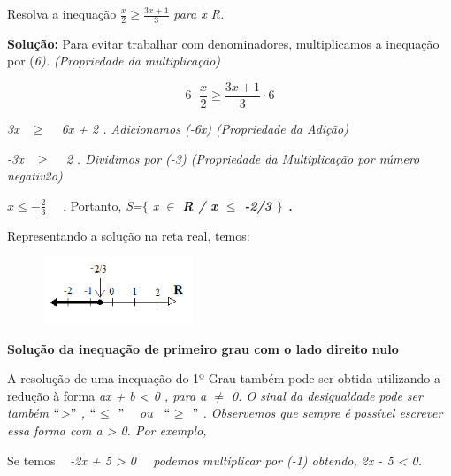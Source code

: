 \begin{texemplo}
Resolva a inequação   \( \frac{x}{2} \geq \frac{3x+1}{3} \) \textit{ para x  R.}

\textbf{Solução:} Para evitar trabalhar com denominadores, multiplicamos a inequação por (\textit{6). (Propriedade da multiplicação)}

 \[  \]  \[ 6 \cdot \frac{x}{2} \geq \frac{3x+1}{3} \cdot 6 \] 

\textit{3x~ $ \geq $ ~ 6x + 2 . Adicionamos (-6x) (Propriedade da Adição)}

\textit{-3x~ $ \geq $ ~ 2 . Dividimos por (-3) (Propriedade da Multiplicação por número negativ2o)}

 \( x  \leq  -\frac{2}{3} \) ~~.  Portanto, \textit{S=$ \{ $ x $\in$ \textbf{R / x $ \leq $  -2/3 $ \} $ . }}

Representando a solução na reta real, temos:

\begin{figure}[H]
	\centering
	\includegraphics[width=1.79in,height=0.79in]{capitulos/inequacoes/media/image3.png}\qedsymbol{}
\end{figure}

\end{texemplo}

\textbf{Solução da inequação de primeiro grau com o lado direito nulo }

A resolução de uma inequação do 1º Grau também pode ser obtida utilizando a redução à forma \textit{ax + b < 0 , para a $ \neq $  0. O sinal da desigualdade pode ser também $``$>$"$ , $``$$ \leq $ $"$ ~ ou ~$``$$ \geq $ $"$  .  Observemos que sempre é possível escrever essa forma com a > 0. Por exemplo, }

Se temos  \textit{~ -2x + 5 > 0~~ podemos multiplicar por (-1) obtendo, 2x - 5 < 0.~~ }

